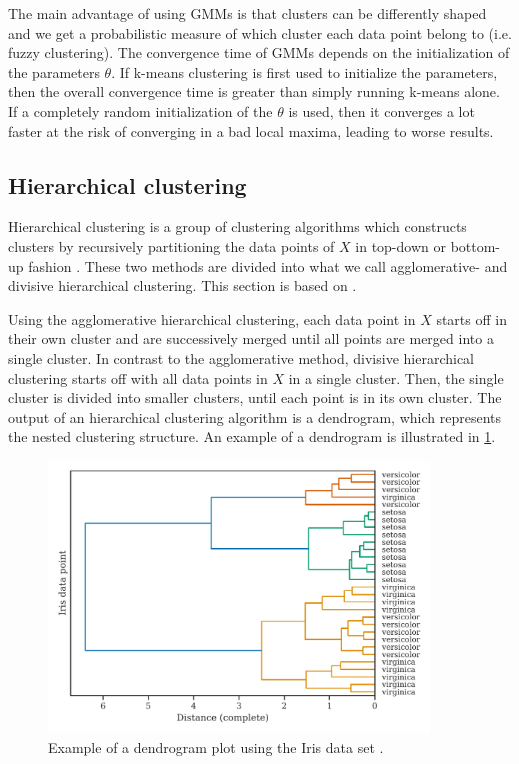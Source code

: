 The main advantage of using GMMs is that clusters can be differently shaped and we get a probabilistic measure of which cluster each data point belong to (i.e. fuzzy clustering). The convergence time of GMMs depends on the initialization of the parameters $\theta$. If k-means clustering is first used to initialize the parameters, then the overall convergence time is greater than simply running k-means alone. If a completely random initialization of the $\theta$ is used, then it converges a lot faster at the risk of converging in a bad local maxima, leading to worse results.

\subsection{Hierarchical clustering}
\label{sec:hierarhical-clustering}
Hierarchical clustering is a group of clustering algorithms which constructs clusters by recursively partitioning the data points of $X$ in top-down or bottom-up fashion \cite{Rokach2005}. These two methods are divided into what we call agglomerative- and divisive hierarchical clustering. This section is based on \cite{Rokach2005}.

Using the agglomerative hierarchical clustering, each data point in $X$ starts off in their own cluster and are successively merged until all points are merged into a single cluster. In contrast to the agglomerative method, divisive hierarchical clustering starts off with all data points in $X$ in a single cluster. Then, the single cluster is divided into smaller clusters, until each point is in its own cluster. The output of an hierarchical clustering algorithm is a dendrogram, which represents the nested clustering structure. An example of a dendrogram is illustrated in \cref{fig:dendrogram-example}.
\begin{figure}[H]
    \centering
    \includegraphics[width=0.9\textwidth]{thesis/figures/dendrogram-example.pdf}
    \caption{Example of a dendrogram plot using the Iris data set \cite{Fisher1936}.}
    \label{fig:dendrogram-example}
\end{figure}

